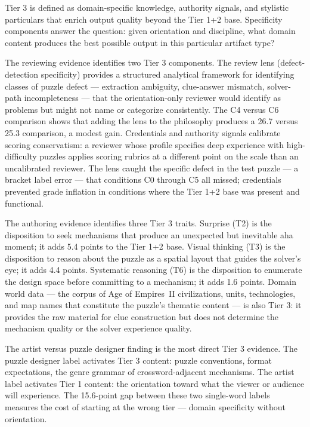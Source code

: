 Tier 3 is defined as domain-specific knowledge, authority signals, and stylistic
particulars that enrich output quality beyond the Tier 1+2 base. Specificity
components answer the question: given orientation and discipline, what domain content
produces the best possible output in this particular artifact type?

The reviewing evidence identifies two Tier 3 components. The review lens (defect-
detection specificity) provides a structured analytical framework for identifying
classes of puzzle defect --- extraction ambiguity, clue-answer mismatch, solver-path
incompleteness --- that the orientation-only reviewer would identify as problems but
might not name or categorize consistently. The C4 versus C6 comparison shows that
adding the lens to the philosophy produces a 26.7 versus 25.3 comparison, a modest
gain. Credentials and authority signals calibrate scoring conservatism: a reviewer
whose profile specifies deep experience with high-difficulty puzzles applies scoring
rubrics at a different point on the scale than an uncalibrated reviewer. The lens
caught the specific defect in the test puzzle --- a bracket label error --- that
conditions C0 through C5 all missed; credentials prevented grade inflation in
conditions where the Tier 1+2 base was present and functional.

The authoring evidence identifies three Tier 3 traits. Surprise (T2) is the
disposition to seek mechanisms that produce an unexpected but inevitable aha moment;
it adds 5.4 points to the Tier 1+2 base. Visual thinking (T3) is the disposition to
reason about the puzzle as a spatial layout that guides the solver's eye; it adds
4.4 points. Systematic reasoning (T6) is the disposition to enumerate the design space
before committing to a mechanism; it adds 1.6 points. Domain world data --- the
corpus of Age of Empires~II civilizations, units, technologies, and map names that
constitute the puzzle's thematic content --- is also Tier 3: it provides the raw
material for clue construction but does not determine the mechanism quality or the
solver experience quality.

The artist versus puzzle designer finding is the most direct Tier 3 evidence. The
puzzle designer label activates Tier 3 content: puzzle conventions, format
expectations, the genre grammar of crossword-adjacent mechanisms. The artist label
activates Tier 1 content: the orientation toward what the viewer or audience will
experience. The 15.6-point gap between these two single-word labels measures the cost
of starting at the wrong tier --- domain specificity without orientation.

